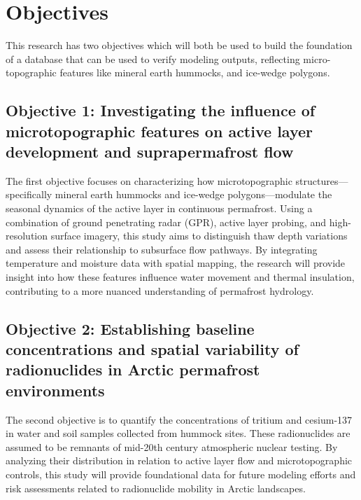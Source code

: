 \chapter{Objectives}
This research has two objectives which will both be used to build the foundation of a database that can be used to verify modeling outputs, reflecting micro-topographic features like mineral earth hummocks, and ice-wedge polygons. 
\section{Objective 1: Investigating the influence of microtopographic features on active layer development and suprapermafrost flow}
The first objective focuses on characterizing how microtopographic structures—specifically mineral earth hummocks and ice-wedge polygons—modulate the seasonal dynamics of the active layer in continuous permafrost. 
Using a combination of ground penetrating radar (GPR), active layer probing, and high-resolution surface imagery, this study aims to distinguish thaw depth variations and assess their relationship to subsurface flow pathways. 
By integrating temperature and moisture data with spatial mapping, the research will provide insight into how these features influence water movement and thermal insulation, contributing to a more nuanced understanding of permafrost hydrology.
\section{Objective 2: Establishing baseline concentrations and spatial variability of radionuclides in Arctic permafrost environments}
The second objective is to quantify the concentrations of tritium and cesium-137 in water and soil samples collected from hummock sites. 
These radionuclides are assumed to be remnants of mid-20th century atmospheric nuclear testing. 
By analyzing their distribution in relation to active layer flow and microtopographic controls, this study will provide foundational data for future modeling efforts and risk assessments related to radionuclide mobility in Arctic landscapes.
